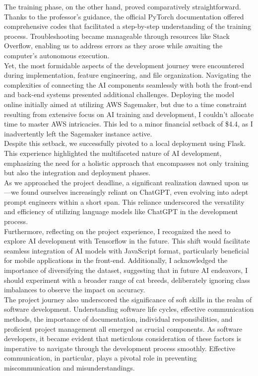\documentclass[conference]{IEEEtran}
\begin{document}
The training phase, on the other hand, proved comparatively straightforward. Thanks to the professor's guidance, the official PyTorch documentation offered comprehensive codes that facilitated a step-by-step understanding of the training process. Troubleshooting became manageable through resources like Stack Overflow, enabling us to address errors as they arose while awaiting the computer's autonomous execution.\\

Yet, the most formidable aspects of the development journey were encountered during implementation, feature engineering, and file organization. Navigating the complexities of connecting the AI components seamlessly with both the front-end and back-end systems presented additional challenges. Deploying the model online initially aimed at utilizing AWS Sagemaker, but due to a time constraint resulting from extensive focus on AI training and development, I couldn't allocate time to master AWS intricacies. This led to a minor financial setback of \$4.4, as I inadvertently left the Sagemaker instance active.\\

Despite this setback, we successfully pivoted to a local deployment using Flask. This experience highlighted the multifaceted nature of AI development, emphasizing the need for a holistic approach that encompasses not only training but also the integration and deployment phases.\\

As we approached the project deadline, a significant realization dawned upon us—we found ourselves increasingly reliant on ChatGPT, even evolving into adept prompt engineers within a short span. This reliance underscored the versatility and efficiency of utilizing language models like ChatGPT in the development process.\\

Furthermore, reflecting on the project experience, I recognized the need to explore AI development with Tensorflow in the future. This shift would facilitate seamless integration of AI models with JavaScript format, particularly beneficial for mobile applications in the front-end. Additionally, I acknowledged the importance of diversifying the dataset, suggesting that in future AI endeavors, I should experiment with a broader range of cat breeds, deliberately ignoring class imbalances to observe the impact on accuracy.\\

The project journey also underscored the significance of soft skills in the realm of software development. Understanding software life cycles, effective communication methods, the importance of documentation, individual responsibilities, and proficient project management all emerged as crucial components. As software developers, it became evident that meticulous consideration of these factors is imperative to navigate through the development process smoothly. Effective communication, in particular, plays a pivotal role in preventing miscommunication and misunderstandings.\\
\end{document}
